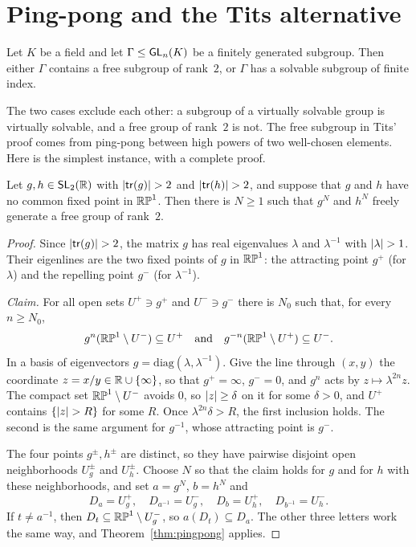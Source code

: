 \section{Ping-pong and the Tits alternative}\label{sec:tits}

\begin{theorem}\label{thm:tits}
Let $K$ be a field and let $\Gamma \le \mathsf{GL}_n(K)$ be a finitely generated
subgroup. Then either $\Gamma$ contains a free subgroup of rank~$2$, or
$\Gamma$ has a solvable subgroup of finite index.
\end{theorem}

The two cases exclude each other: a subgroup of a virtually solvable group is
virtually solvable, and a free group of rank~$2$ is not. The free subgroup in
Tits' proof comes from ping-pong between high powers of two well-chosen
elements. Here is the simplest instance, with a complete proof.

\begin{proposition}\label{prop:hyperbolic}
Let $g, h \in \mathsf{SL}_2(\mathbb{R})$ with $\left|\mathsf{tr}(g)\right| > 2$ and $\left|\mathsf{tr}(h)\right| > 2$, and
suppose that $g$ and $h$ have no common fixed point in $\mathbb{RP}^1$. Then there is
$N \ge 1$ such that $g^N$ and $h^N$ freely generate a free group of rank~$2$.
\end{proposition}

\begin{proof}
Since $\left|\mathsf{tr}(g)\right| > 2$, the matrix $g$ has real eigenvalues $\lambda$ and
$\lambda^{-1}$ with $\left|\lambda\right| > 1$. Their eigenlines are the two fixed
points of $g$ in $\mathbb{RP}^1$: the attracting point $g^+$ (for $\lambda$) and the
repelling point $g^-$ (for $\lambda^{-1}$).

\emph{Claim.} For all open sets $U^+ \ni g^+$ and $U^- \ni g^-$ there is $N_0$
such that, for every $n \ge N_0$,
\[
  g^n(\mathbb{RP}^1 \setminus U^-) \subseteq U^+ \quad\text{and}\quad
  g^{-n}(\mathbb{RP}^1 \setminus U^+) \subseteq U^-.
\]
In a basis of eigenvectors $g = \mathrm{diag}(\lambda, \lambda^{-1})$. Give
the line through $(x,y)$ the coordinate $z = x/y \in \mathbb{R} \cup \{\infty\}$, so
that $g^+ = \infty$, $g^- = 0$, and $g^n$ acts by $z \mapsto \lambda^{2n} z$.
The compact set $\mathbb{RP}^1 \setminus U^-$ avoids $0$, so $\left|z\right| \ge \delta$ on
it for some $\delta > 0$, and $U^+$ contains $\{\left|z\right| > R\}$ for some $R$.
Once $\lambda^{2n}\delta > R$, the first inclusion holds. The second is the
same argument for $g^{-1}$, whose attracting point is $g^-$.

The four points $g^\pm, h^\pm$ are distinct, so they have pairwise disjoint
open neighborhoods $U_g^\pm$ and $U_h^\pm$. Choose $N$ so that the claim
holds for $g$ and for $h$ with these neighborhoods, and set $a = g^N$,
$b = h^N$ and
\[
  D_a = U_g^+, \quad D_{a^{-1}} = U_g^-, \quad D_b = U_h^+, \quad D_{b^{-1}} = U_h^-.
\]
If $t \ne a^{-1}$, then $D_t \subseteq \mathbb{RP}^1 \setminus U_g^-$, so
$a(D_t) \subseteq D_a$. The other three letters work the same way, and
Theorem~\ref{thm:pingpong} applies.
\end{proof}

